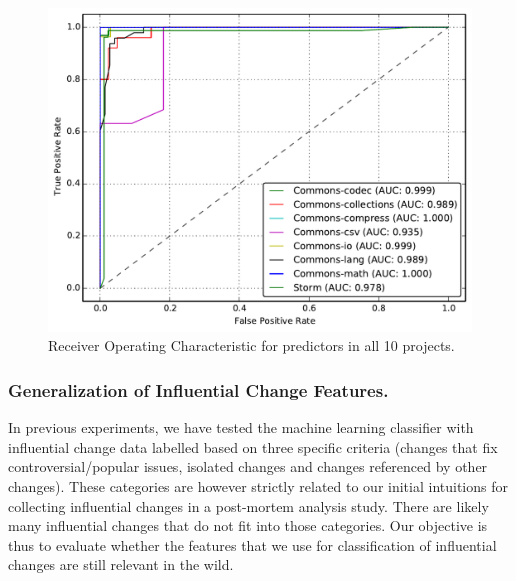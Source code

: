 \begin{figure}
\centering
	\includegraphics[width=0.8\linewidth]{fig/roc}
	\caption{Receiver Operating Characteristic for predictors in all 10 projects.}
	\label{fig:auroc}
\end{figure}


\subsubsection{Generalization of Influential Change Features.}
In previous experiments, we have tested the machine learning classifier with
influential change data labelled based on three specific criteria (changes that
fix controversial/popular issues, isolated changes and changes referenced by other changes).
These categories are however strictly related to our initial intuitions for collecting influential
changes in a post-mortem analysis study. There are likely many influential changes that do not
fit into those categories. Our objective is thus to evaluate whether the features that we
use for classification of influential changes are still relevant in the wild.




